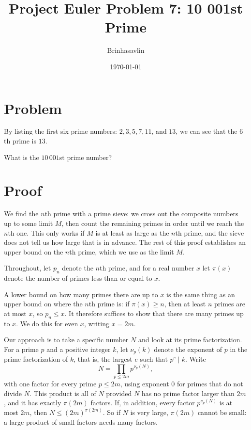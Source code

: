 \documentclass{article}
\title{Project Euler Problem 7: 10 001st Prime}
\author{Brinhasavlin}
\date{\today}
\begin{document}
\maketitle

\section*{Problem}

By listing the first six prime numbers: $2, 3, 5, 7, 11$, and $13$, we can see that the $6$th prime is $13$.

What is the $10\,001$st prime number?

\section*{Proof}

We find the $n$th prime with a prime sieve: we cross out the composite numbers up to some limit $M$, then count the
remaining primes in order until we reach the $n$th one. This only works if $M$ is at least as large as the $n$th prime,
and the sieve does not tell us how large that is in advance. The rest of this proof establishes an upper bound on the
$n$th prime, which we use as the limit $M$.

Throughout, let $p_n$ denote the $n$th prime, and for a real number $x$ let $\pi(x)$ denote the number of primes less
than or equal to $x$.

A lower bound on how many primes there are up to $x$ is the same thing as an upper bound on where the $n$th prime is:
if $\pi(x) \ge n$, then at least $n$ primes are at most $x$, so $p_n \le x$. It therefore suffices to show that there
are many primes up to $x$. We do this for even $x$, writing $x = 2m$.

Our approach is to take a specific number $N$ and look at its prime factorization. For a prime $p$ and a positive
integer $k$, let $\nu_p(k)$ denote the exponent of $p$ in the prime factorization of $k$, that is, the largest $e$ such
that $p^e \mid k$. Write
\[
  N = \prod_{p \le 2m} p^{\nu_p(N)},
\]
with one factor for every prime $p \le 2m$, using exponent $0$ for primes that do not divide $N$. This product is all of
$N$ provided $N$ has no prime factor larger than $2m$, and it has exactly $\pi(2m)$ factors. If, in addition, every
factor $p^{\nu_p(N)}$ is at most $2m$, then $N \le {(2m)}^{\pi(2m)}$. So if $N$ is very large, $\pi(2m)$ cannot be
small: a large product of small factors needs many factors.
\end{document}
